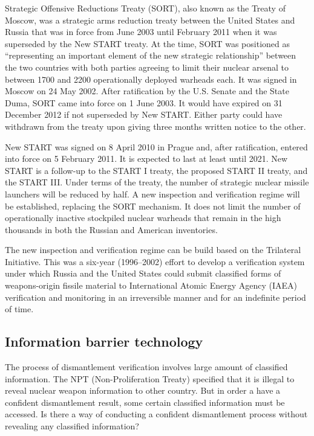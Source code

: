 \documentclass[twoside,titlepage,11pt,twocolumn,a4paper]{article}
\begin{document}
Strategic Offensive Reductions Treaty (SORT), also known as the Treaty
of Moscow, was a strategic arms reduction treaty between the United
States and Russia that was in force from June 2003 until February 2011
when it was superseded by the New START treaty. \citep{USRussia} At
the time, SORT was positioned as ``representing an important element
of the new strategic relationship'' between the two countries with
both parties agreeing to limit their nuclear arsenal to between 1700
and 2200 operationally deployed warheads each. It was signed in Moscow
on 24 May 2002. After ratification by the U.S. Senate and the State
Duma, SORT came into force on 1 June 2003. It would have expired on 31
December 2012 if not superseded by New START. Either party could have
withdrawn from the treaty upon giving three months written notice to
the other.

New START was signed on 8 April 2010 in Prague and, after
ratification, entered into force on 5 February 2011. It is expected to
last at least until 2021. \citep{USAtoday} New START is a follow-up to
the START I treaty, the proposed START II treaty, and the START
III. Under terms of the treaty, the number of strategic nuclear
missile launchers will be reduced by half. A new inspection and
verification regime will be established, replacing the SORT
mechanism. It does not limit the number of operationally inactive
stockpiled nuclear warheads that remain in the high thousands in both
the Russian and American inventories.

The new inspection and verification regime can be build based on the
Trilateral Initiative. \citep{zarimpas2003} This was a six-year
(1996--2002) effort to develop a verification system under which Russia
and the United States could submit classified forms of weapons-origin
fissile material to International Atomic Energy Agency (IAEA)
verification and monitoring in an irreversible manner and for an
indefinite period of time.

\subsection{Information barrier technology}
The process of dismantlement verification involves large amount of
classified information. The NPT (Non-Proliferation Treaty) specified
that it is illegal to reveal nuclear weapon information to other
country. But in order a have a confident dismantlement result, some
certain classified information must be accessed. Is there a way of
conducting a confident dismantlement process without revealing any
classified information?
\end{document}
